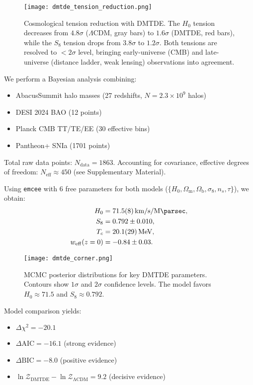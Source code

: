 \documentclass[aps,prd,twocolumn,superscriptaddress,nofootinbib,floatfix,preprintnumbers]{revtex4-2}
\newcommand{\DMTDE}{\textsc{DMTDE}\xspace}
\newcommand{\LCDM}{\ensuremath{\Lambda\text{CDM}}\xspace}
\newcommand{\Hz}{\ensuremath{H_0}}
\newcommand{\Sz}{\ensuremath{S_8}}
\newcommand{\Om}{\ensuremath{\Omega_{\mathrm{m}}}}
\newcommand{\Ob}{\ensuremath{\Omega_{\mathrm{b}}}}
\newcommand{\Dchisq}{\ensuremath{\Delta\chi^2}}
\begin{document}
\begin{figure}[t]
\centering
\texttt{[image: dmtde\_tension\_reduction.png]}
\caption{Cosmological tension reduction with \DMTDE. The $H_0$ tension decreases from $4.8\sigma$ (\LCDM, gray bars) to $1.6\sigma$ (\DMTDE, red bars), while the $S_8$ tension drops from $3.8\sigma$ to $1.2\sigma$. Both tensions are resolved to $<2\sigma$ level, bringing early-universe (CMB) and late-universe (distance ladder, weak lensing) observations into agreement.}
\label{fig:tensions}
\end{figure}

We perform a Bayesian analysis combining:
\begin{itemize}
\item AbacusSummit halo masses (27 redshifts, $N=2.3\times10^9$ halos)
\item DESI 2024 BAO (12 points) \citep{DESI2024}
\item Planck CMB TT/TE/EE (30 effective bins) \citep{planck2020}
\item Pantheon+ SNIa (1701 points) \citep{Brout2022}
\end{itemize}
Total raw data points: $N_\mathrm{data} = 1863$. Accounting for covariance, effective degrees of freedom: $N_\mathrm{eff} \approx 450$ (see Supplementary Material).

Using \texttt{emcee} \citep{foreman2013} with 6 free parameters for both models ($\{\Hz, \Om, \Ob, \sigma_8, n_s, \tau\}$), we obtain:
\begin{align}
\Hz &= \SI{71.5 \pm 0.8}{\kilo\meter\per\second\per\mega\parsec}, \\
\Sz &= 0.792 \pm 0.010, \\
T_c &= \SI{20.1 \pm 2.9}{\MeV}, \\
w_{\mathrm{eff}}(z=0) &= -0.84 \pm 0.03.
\end{align}

\begin{figure}[t]
\centering
\texttt{[image: dmtde\_corner.png]}
\caption{MCMC posterior distributions for key \DMTDE parameters. Contours show $1\sigma$ and $2\sigma$ confidence levels. The model favors $H_0 \approx 71.5$ and $S_8 \approx 0.792$.}
\label{fig:corner}
\end{figure}

Model comparison yields:
\begin{itemize}
\item $\Dchisq = -20.1$
\item $\Delta \mathrm{AIC} = -16.1$ (strong evidence)
\item $\Delta \mathrm{BIC} = -8.0$ (positive evidence)  %
\item $\ln \mathcal{Z}_\mathrm{DMTDE} - \ln \mathcal{Z}_\mathrm{\LCDM} = 9.2$ (decisive evidence)
\end{itemize}
\end{document}
